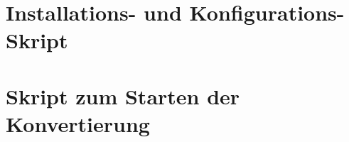 \newpage
\section{Installations- und Konfigurations-Skript} \label{configureScript}


\newpage
\section{Skript zum Starten der Konvertierung} \label{startingConvertScript}


